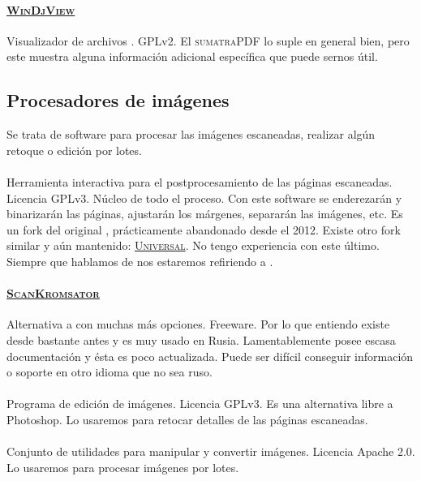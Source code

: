 \documentclass[%
	a5paper,
	10pt,
	twoside,
	openright,
	final,
]{memoir}
\begin{document}
	\paragraph{\href{https://windjview.sourceforge.io}{\textsc{WinDjView}}} Visualizador de archivos \djvu. GPLv2. El \textsc{sumatraPDF} lo suple en general bien, pero este muestra alguna información adicional específica que puede sernos útil.

	\subsection{Procesadores de imágenes} Se trata de software para procesar las imágenes escaneadas, realizar algún retoque o edición por lotes.
	\paragraph{\href{https://github.com/4lex4/scantailor-advanced}{\scantailorAdvanced}} Herramienta interactiva para el postprocesamiento de las páginas escaneadas. Licencia GPLv3. Núcleo de todo el proceso. Con este software se enderezarán y binarizarán las páginas, ajustarán los márgenes, separarán las imágenes, etc. Es un fork del original \href{scantailor.org}{\mbox{\scantailor}}, prácticamente abandonado desde el 2012. Existe otro fork similar y aún mantenido: \href{https://github.com/trufanov-nok/scantailor}{\textsc{\scantailor Universal}}. No tengo experiencia con este último. Siempre que hablamos de \scantailor nos estaremos refiriendo a \scantailorAdvanced.
	\paragraph{\href{http://forum.ru-board.com/topic.cgi?forum=5&topic=29984}{\textsc{ScanKromsator}}} Alternativa a \scantailor con muchas más opciones. Freeware. Por lo que entiendo existe desde bastante antes y es muy usado en Rusia. Lamentablemente posee escasa documentación y ésta es poco actualizada. Puede ser difícil conseguir información o soporte en otro idioma que no sea ruso.
	\paragraph{\href{https://www.gimp.org}{\gimp}} Programa de edición de imágenes. Licencia GPLv3. Es una alternativa libre a Photoshop. Lo usaremos para retocar detalles de las páginas escaneadas.
	\paragraph{\href{https://www.imagemagick.org}{\imagemagick}} Conjunto de utilidades para manipular y convertir imágenes. Licencia Apache 2.0. Lo usaremos para procesar imágenes por lotes.
\end{document}
